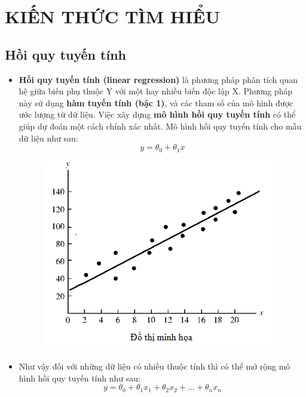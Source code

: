 \documentclass{report}
\begin{document}
\section{KIẾN THỨC TÌM HIỂU}
\subsection{Hồi quy tuyến tính}
    \begin{itemize}
        \item \textbf{Hồi quy tuyến tính {(linear regression)}} là phương pháp phân tích quan hệ giữa biến phụ thuộc Y với một hay nhiều biến độc lập X. Phương pháp này sử dụng \textbf{hàm tuyến tính (bậc 1)}, và các tham số của mô hình được ước lượng từ dữ liệu. Việc xây dựng \textbf{mô hình hồi quy tuyến tính} có thể giúp dự đoán một cách chính xác nhất. Mô hình hồi quy tuyến tính cho mẫu dữ liệu như sau:
        \begin{equation}
            y = \theta_0 + \theta_1x
        \end{equation} 
        \begin{figure}[H]
            \includegraphics[width=\textwidth, height=0.4\textheight, keepaspectratio]{assets/linear_ex.png}
            \centering
        \end{figure}

        \item Như vậy đối với những dữ liệu có nhiều thuộc tính thì có thể mở rộng mô hình hồi quy tuyến tính như sau:
        \begin{equation}
            y = \theta_0 + \theta_1x_1 + \theta_2x_2 + ... + \theta_nx_n
        \end{equation}
    \end{itemize}
\end{document}
